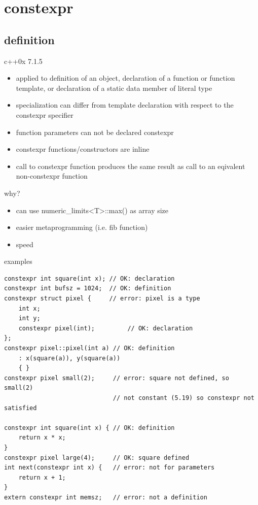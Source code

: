 \documentclass{beamer}
\begin{document}
\section{constexpr}
\subsection{definition}
\begin{frame}{c++0x 7.1.5}
  \begin{block}{}
    \begin{itemize}
    \item applied to definition of an object, declaration of a
      function or function template, or declaration of a static data
      member of literal type
    \item specialization can differ from template declaration with
      respect to the constexpr specifier
    \item function parameters can not be declared constexpr
    \item constexpr functions/constructors are inline
    \item call to constexpr function produces the same result as call
      to an eqivalent non-constexpr function
    \end{itemize}
  \end{block}
\end{frame}

\begin{frame}{why?}
  \begin{block}{}
    \begin{itemize}
    \item can use numeric\_limits<T>::max() as array size
    \item easier metaprogramming (i.e. fib function)
    \item speed
    \end{itemize}
  \end{block}
\end{frame}

\begin{frame}{examples}
  \begin{block}{}
\begin{verbatim}
constexpr int square(int x); // OK: declaration
constexpr int bufsz = 1024;  // OK: definition
constexpr struct pixel {     // error: pixel is a type
    int x;
    int y;
    constexpr pixel(int);         // OK: declaration
};
constexpr pixel::pixel(int a) // OK: definition
    : x(square(a)), y(square(a))
    { }
constexpr pixel small(2);     // error: square not defined, so small(2)
                              // not constant (5.19) so constexpr not satisfied

constexpr int square(int x) { // OK: definition
    return x * x;
}
constexpr pixel large(4);     // OK: square defined
int next(constexpr int x) {   // error: not for parameters
    return x + 1;
}
extern constexpr int memsz;   // error: not a definition

\end{verbatim}
  \end{block}
\end{frame}
\end{document}
